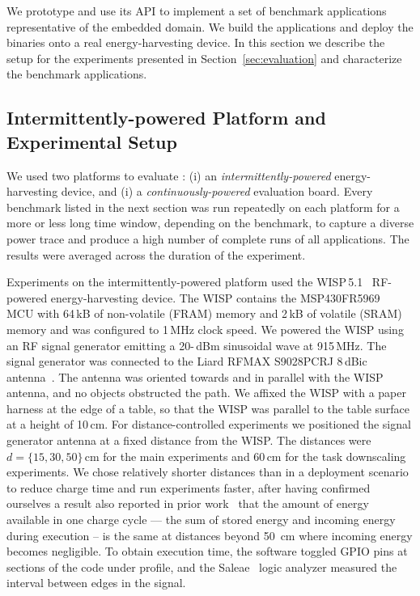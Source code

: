 We prototype \sys and use its API to implement a set of benchmark
applications representative of the embedded domain. We build the applications
and deploy the binaries onto a real energy-harvesting device. In this section
we describe the setup for the experiments presented in
Section~\ref{sec:evaluation} and characterize the benchmark applications.

\subsection{Intermittently-powered Platform and Experimental Setup}
\label{sec:results_hardware_software}

We used two platforms to evaluate \sys: (i) an \emph{intermittently-powered}
energy-harvesting device, and (i) a \emph{continuously-powered} evaluation
board.
%
Every benchmark listed in the next section was run repeatedly on
each platform for a more or less long time window, depending on the benchmark,
to capture a diverse power trace and produce a high number of complete runs of all applications.
The results were averaged across the duration of the experiment.

Experiments on the intermittently-powered platform used the
WISP\,5.1~\cite{wisp5,wisp} RF-powered energy-harvesting device.
%
The WISP contains the MSP430FR5969~\cite{wolverine} MCU with 64\,kB of
non-volatile (FRAM) memory and 2\,kB of volatile (SRAM) memory and was
configured to 1\,MHz clock speed.
%
We powered the WISP using an RF signal generator emitting  a 20-\,dBm sinusoidal wave at 915\,MHz.
The signal generator was connected to the Liard RFMAX S9028PCRJ 8\,dBic
antenna~\cite{atlas2015}.
%
The antenna was oriented towards and in parallel with the WISP antenna, and
no objects obstructed the path.
%
We affixed the WISP with a paper harness at the edge of a table, so that the
WISP was parallel to the table surface at a height of 10\,cm.
%
For distance-controlled experiments we positioned the signal generator
antenna at a fixed distance from the WISP. The distances were $d=\{15, 30,
50\}$\,cm for the main experiments and 60\,cm for the task downscaling
experiments.
%
We chose relatively shorter distances than in a deployment scenario to reduce
charge time and run experiments faster, after having confirmed ourselves a
result also reported in prior work~\cite{alpaca} that the amount of energy
available in one charge cycle --- the sum of stored energy and incoming energy
during execution -- is the same at distances beyond 50~cm where incoming energy
becomes negligible.
%
To obtain execution time, the software toggled GPIO pins at sections of the code
under profile, and the Saleae~\cite{saleae} logic analyzer measured
the interval between edges in the signal.

